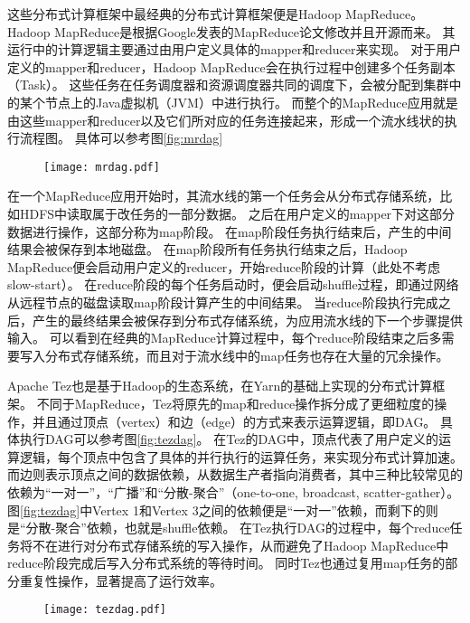 这些分布式计算框架中最经典的分布式计算框架便是Hadoop MapReduce\cite{hadoop}。
Hadoop MapReduce是根据Google发表的MapReduce\cite{mapreduce}论文修改并且开源而来。
其运行中的计算逻辑主要通过由用户定义具体的mapper和reducer来实现。
对于用户定义的mapper和reducer，Hadoop MapReduce会在执行过程中创建多个任务副本（Task）。
这些任务在任务调度器和资源调度器共同的调度下，会被分配到集群中的某个节点上的Java虚拟机（JVM）中进行执行。
而整个的MapReduce应用就是由这些mapper和reducer以及它们所对应的任务连接起来，形成一个流水线状的执行流程图。
具体可以参考图\ref{fig:mrdag}

\begin{figure}[!htp]
    \centering
    \texttt{[image: mrdag.pdf]}
\end{figure}

在一个MapReduce应用开始时，其流水线的第一个任务会从分布式存储系统，比如HDFS中读取属于改任务的一部分数据。
之后在用户定义的mapper下对这部分数据进行操作，这部分称为map阶段。
在map阶段任务执行结束后，产生的中间结果会被保存到本地磁盘。
在map阶段所有任务执行结束之后，Hadoop MapReduce便会启动用户定义的reducer，开始reduce阶段的计算（此处不考虑slow-start）。
在reduce阶段的每个任务启动时，便会启动shuffle过程，即通过网络从远程节点的磁盘读取map阶段计算产生的中间结果。
当reduce阶段执行完成之后，产生的最终结果会被保存到分布式存储系统，为应用流水线的下一个步骤提供输入。
可以看到在经典的MapReduce计算过程中，每个reduce阶段结束之后多需要写入分布式存储系统，而且对于流水线中的map任务也存在大量的冗余操作。

Apache Tez\cite{tez}也是基于Hadoop的生态系统，在Yarn的基础上\cite{yarn}实现的分布式计算框架。
不同于MapReduce，Tez将原先的map和reduce操作拆分成了更细粒度的操作，并且通过顶点（vertex）和边（edge）的方式来表示运算逻辑，即DAG。
具体执行DAG可以参考图\ref{fig:tezdag}。
在Tez的DAG中，顶点代表了用户定义的运算逻辑，每个顶点中包含了具体的并行执行的运算任务，来实现分布式计算加速。
而边则表示顶点之间的数据依赖，从数据生产者指向消费者，其中三种比较常见的依赖为“一对一”，“广播”和“分散-聚合”（one-to-one, broadcast, scatter-gather）。
图\ref{fig:tezdag}中Vertex 1和Vertex 3之间的依赖便是“一对一”依赖，而剩下的则是“分散-聚合”依赖，也就是shuffle依赖。
在Tez执行DAG的过程中，每个reduce任务将不在进行对分布式存储系统的写入操作，从而避免了Hadoop MapReduce中reduce阶段完成后写入分布式系统的等待时间。
同时Tez也通过复用map任务的部分重复性操作，显著提高了运行效率。

\begin{figure}[!htp]
    \centering
    \texttt{[image: tezdag.pdf]}
\end{figure}

